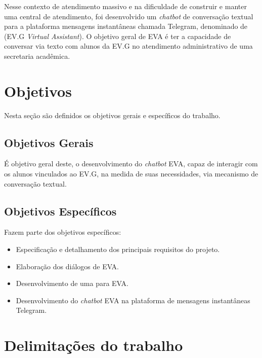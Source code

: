 Nesse contexto de atendimento massivo e na dificuldade de construir e manter uma central de atendimento, foi desenvolvido um \textit{chatbot} de conversação textual para a plataforma mensagens instantâneas chamada  Telegram, denominado de  (EV.G \textit{Virtual Assistant}).
O objetivo geral de EVA é ter a capacidade de conversar via texto com alunos da EV.G no atendimento administrativo de uma secretaria acadêmica.


\section{Objetivos}\label{cap:01:sec:01:objetivos}

Nesta seção são definidos os objetivos gerais e específicos do trabalho.


\subsection{Objetivos Gerais}\label{cap:01:sec:01:sub:01:objetivo-geral}

É objetivo geral deste, o desenvolvimento do \textit{chatbot} EVA, capaz de interagir com os alunos vinculados ao EV.G, na medida de suas necessidades, via mecanismo de conversação textual.


\subsection{Objetivos Específicos}\label{cap:01:sec:01:sub:02:ojetivos-especificos}

Fazem parte dos objetivos específicos:

\begin{itemize}
    \item Especificação e detalhamento dos principais requisitos do projeto.
    \item Elaboração dos diálogos de EVA.
    \item Desenvolvimento de uma  para EVA.
    \item Desenvolvimento do \textit{chatbot} EVA na plataforma de mensagens instantâneas Telegram.
\end{itemize}


\section{Delimitações do trabalho}\label{cap:01:sec:03:delimitacao}

